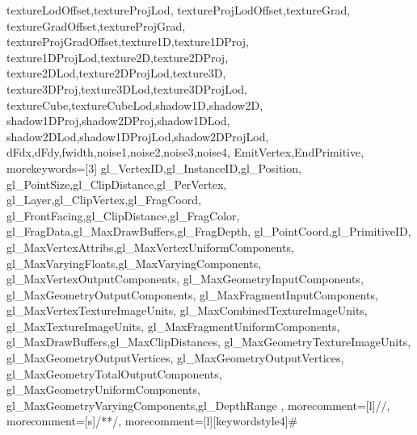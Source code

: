 {{		textureLodOffset,textureProjLod,
		textureProjLodOffset,textureGrad,
		textureGradOffset,textureProjGrad,
		textureProjGradOffset,texture1D,texture1DProj,
		texture1DProjLod,texture2D,texture2DProj,
		texture2DLod,texture2DProjLod,texture3D,
		texture3DProj,texture3DLod,texture3DProjLod,
		textureCube,textureCubeLod,shadow1D,shadow2D,
		shadow1DProj,shadow2DProj,shadow1DLod,
		shadow2DLod,shadow1DProjLod,shadow2DProjLod,
		dFdx,dFdy,fwidth,noise1,noise2,noise3,noise4,
		EmitVertex,EndPrimitive},
		morekeywords=[3]{
		gl_VertexID,gl_InstanceID,gl_Position,
		gl_PointSize,gl_ClipDistance,gl_PerVertex,
		gl_Layer,gl_ClipVertex,gl_FragCoord,
		gl_FrontFacing,gl_ClipDistance,gl_FragColor,
		gl_FragData,gl_MaxDrawBuffers,gl_FragDepth,
		gl_PointCoord,gl_PrimitiveID,
		gl_MaxVertexAttribs,gl_MaxVertexUniformComponents,
		gl_MaxVaryingFloats,gl_MaxVaryingComponents,
		gl_MaxVertexOutputComponents,
		gl_MaxGeometryInputComponents,
		gl_MaxGeometryOutputComponents,
		gl_MaxFragmentInputComponents,
		gl_MaxVertexTextureImageUnits,
		gl_MaxCombinedTextureImageUnits,
		gl_MaxTextureImageUnits,
		gl_MaxFragmentUniformComponents,
		gl_MaxDrawBuffers,gl_MaxClipDistances,
		gl_MaxGeometryTextureImageUnits,
		gl_MaxGeometryOutputVertices,
		gl_MaxGeometryOutputVertices,
		gl_MaxGeometryTotalOutputComponents,
		gl_MaxGeometryUniformComponents,
		gl_MaxGeometryVaryingComponents,gl_DepthRange
	},
	morecomment=[l]{//},
	morecomment=[s]{/*}{*/},
	morecomment=[l][keywordstyle4]{\#}
}

